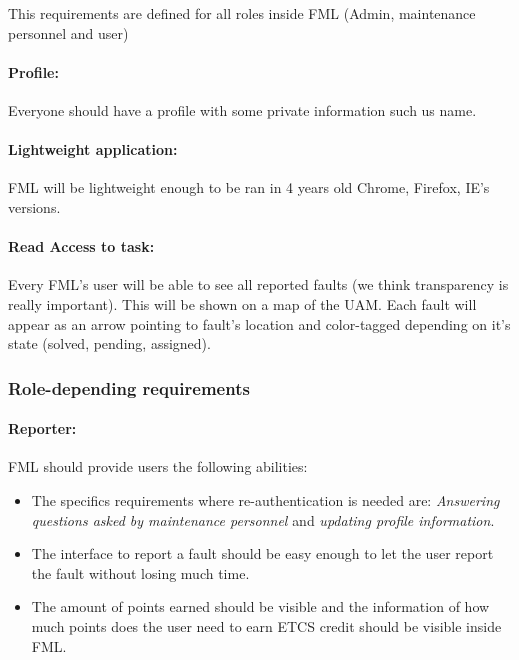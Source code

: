 This requirements are defined for all roles inside FML (Admin, maintenance personnel and user)

\paragraph{Profile: } Everyone should have a profile with some private information such us name.

\paragraph{Lightweight application: } 
FML will be lightweight enough to be ran in  4 years old Chrome, Firefox, IE's versions. 

\paragraph{Read Access to task: } Every FML's user will be able to see all reported faults (we think transparency is really important). This will be shown on a map of the UAM. Each fault will appear as an arrow pointing to fault's location and color-tagged depending on it's state (solved, pending, assigned).

\subsubsection{Role-depending requirements}

\paragraph{Reporter: } FML should provide users the following abilities:
\begin{itemize}
\item The specifics requirements where re-authentication is needed are: \textit{Answering questions asked by maintenance personnel}   \label{Specifics_Secure_Requirements_for_user} and \textit{updating profile information}.
\item The interface to report a fault should be easy enough to let the user report the fault without losing much time.
\item The amount of points earned should be visible and the information of how much points does the user need to earn ETCS credit should be visible inside FML.

\end{itemize}
